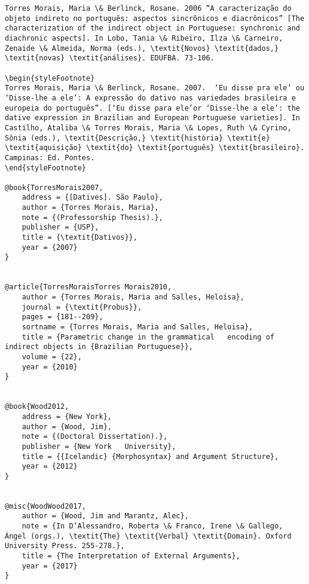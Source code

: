\documentclass[output=paper,modfonts,nonflat]{langsci/langscibook}
\begin{document}
\begin{verbatim}
Torres Morais, Maria \& Berlinck, Rosane. 2006 “A caracterização do objeto indireto no português: aspectos sincrônicos e diacrônicos” [The characterization of the indirect object in Portuguese: synchronic and diachronic aspects]. In Lobo, Tania \& Ribeiro, Ilza \& Carneiro, Zenaide \& Almeida, Norma (eds.), \textit{Novos} \textit{dados,} \textit{novas} \textit{análises}. EDUFBA. 73-106.

\begin{styleFootnote}
Torres Morais, Maria \& Berlinck, Rosane. 2007.  ‘Eu disse pra ele’ ou ‘Disse-lhe a ele’: A expressão do dativo nas variedades brasileira e europeia do português”. [‘Eu disse para ele’or ‘Disse-lhe a ele’: the dative expression in Brazilian and European Portuguese varieties]. In Castilho, Ataliba \& Torres Morais, Maria \& Lopes, Ruth \& Cyrino, Sônia (eds.), \textit{Descrição,} \textit{história} \textit{e} \textit{aquisição} \textit{do} \textit{português} \textit{brasileiro}. Campinas: Ed. Pontes.
\end{styleFootnote}

@book{TorresMorais2007,
	address = {[Datives]. São Paulo},
	author = {Torres Morais, Maria},
	note = {(Professorship Thesis).},
	publisher = {USP},
	title = {\textit{Dativos}},
	year = {2007}
}


@article{TorresMoraisTorres Morais2010,
	author = {Torres Morais, Maria and Salles, Heloísa},
	journal = {\textit{Probus}},
	pages = {181--209},
	sortname = {Torres Morais, Maria and Salles, Heloisa},
	title = {Parametric change in the grammatical   encoding of indirect objects in {Brazilian Portuguese}},
	volume = {22},
	year = {2010}
}


@book{Wood2012,
	address = {New York},
	author = {Wood, Jim},
	note = {(Doctoral Dissertation).},
	publisher = {New York   University},
	title = {{Icelandic} {Morphosyntax} and Argument Structure},
	year = {2012}
}


@misc{WoodWood2017,
	author = {Wood, Jim and Marantz, Alec},
	note = {In D’Alessandro, Roberta \& Franco, Irene \& Gallego, Ángel (orgs.), \textit{The} \textit{Verbal} \textit{Domain}. Oxford University Press. 255-278.},
	title = {The Interpretation of External Arguments},
	year = {2017}
}


\end{verbatim}
\sloppy\printbibliography[heading=subbibliography,notkeyword=this]
\end{document}
